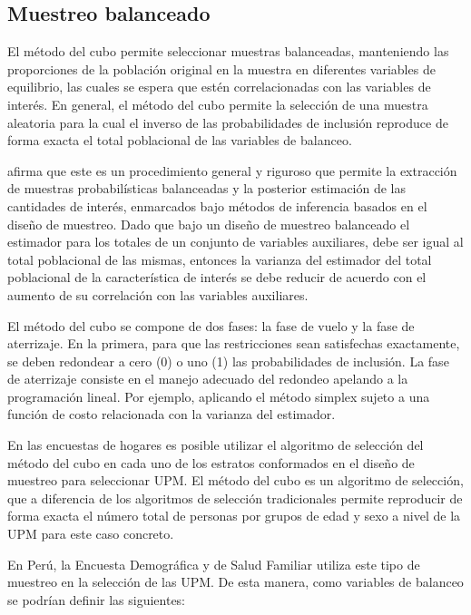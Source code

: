 \documentclass[
  12pt,
]{book}
\begin{document}
\hypertarget{muestreo-balanceado}{%
\subsection{Muestreo balanceado}\label{muestreo-balanceado}}

El método del cubo \citep{Tille2006} permite seleccionar muestras balanceadas, manteniendo las proporciones de la población original en la muestra en diferentes variables de equilibrio, las cuales se espera que estén correlacionadas con las variables de interés. En general, el método del cubo permite la selección de una muestra aleatoria para la cual el inverso de las probabilidades de inclusión reproduce de forma exacta el total poblacional de las variables de balanceo.

\citet{Gutierrez_2016} afirma que este es un procedimiento general y riguroso que permite la extracción de muestras probabilísticas balanceadas y la posterior estimación de las cantidades de interés, enmarcados bajo métodos de inferencia basados en el diseño de muestreo. Dado que bajo un diseño de muestreo balanceado el estimador para los totales de un conjunto de variables auxiliares, debe ser igual al total poblacional de las mismas, entonces la varianza del estimador del total poblacional de la característica de interés se debe reducir de acuerdo con el aumento de su correlación con las variables auxiliares.

El método del cubo se compone de dos fases: la fase de vuelo y la fase de aterrizaje. En la primera, para que las restricciones sean satisfechas exactamente, se deben redondear a cero (0) o uno (1) las probabilidades de inclusión. La fase de aterrizaje consiste en el manejo adecuado del redondeo apelando a la programación lineal. Por ejemplo, aplicando el método simplex sujeto a una función de costo relacionada con la varianza del estimador.

En las encuestas de hogares es posible utilizar el algoritmo de selección del método del cubo en cada uno de los estratos conformados en el diseño de muestreo para seleccionar UPM. El método del cubo es un algoritmo de selección, que a diferencia de los algoritmos de selección tradicionales permite reproducir de forma exacta el número total de personas por grupos de edad y sexo a nivel de la UPM para este caso concreto.

En Perú, la Encuesta Demográfica y de Salud Familiar utiliza este tipo de muestreo en la selección de las UPM. De esta manera, como variables de balanceo se podrían definir las siguientes:
\end{document}
